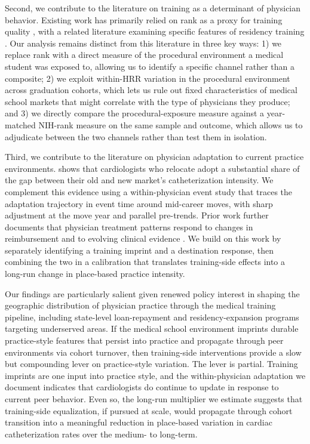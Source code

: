 \documentclass[12pt]{article}
\let\textcite\citet
\begin{document}
Second, we contribute to the literature on training as a determinant of physician behavior. Existing work has primarily relied on rank as a proxy for training quality \citep{schnell2018, doyle_jr_returns_2010}, with a related literature examining specific features of residency training \citep{epstein2009}. Our analysis remains distinct from this literature in three key ways: 1) we replace rank with a direct measure of the procedural environment a medical student was exposed to, allowing us to identify a specific channel rather than a composite; 2) we exploit within-HRR variation in the procedural environment across graduation cohorts, which lets us rule out fixed characteristics of medical school markets that might correlate with the type of physicians they produce; and 3) we directly compare the procedural-exposure measure against a year-matched NIH-rank measure on the same sample and outcome, which allows us to adjudicate between the two channels rather than test them in isolation.

Third, we contribute to the literature on physician adaptation to current practice environments. \textcite{molitor2018} shows that cardiologists who relocate adopt a substantial share of the gap between their old and new market's catheterization intensity. We complement this evidence using a within-physician event study that traces the adaptation trajectory in event time around mid-career moves, with sharp adjustment at the move year and parallel pre-trends. Prior work further documents that physician treatment patterns respond to changes in reimbursement \citep{clemens2014} and to evolving clinical evidence \citep{decicca_how_2024}. We build on this work by separately identifying a training imprint and a destination response, then combining the two in a calibration that translates training-side effects into a long-run change in place-based practice intensity.

Our findings are particularly salient given renewed policy interest in shaping the geographic distribution of physician practice through the medical training pipeline, including state-level loan-repayment and residency-expansion programs targeting underserved areas. If the medical school environment imprints durable practice-style features that persist into practice and propagate through peer environments via cohort turnover, then training-side interventions provide a slow but compounding lever on practice-style variation. The lever is partial. Training imprints are one input into practice style, and the within-physician adaptation we document indicates that cardiologists do continue to update in response to current peer behavior. Even so, the long-run multiplier we estimate suggests that training-side equalization, if pursued at scale, would propagate through cohort transition into a meaningful reduction in place-based variation in cardiac catheterization rates over the medium- to long-term.
\end{document}
